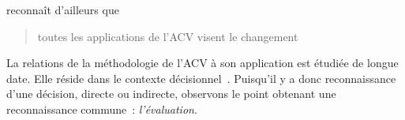 \citeauthor{tillman_significance_2000} reconnaît d'ailleurs que 
\blockcquote{tillman_significance_2000}{toutes les applications de l'\gls{ACV} visent le changement}.
La relations de la méthodologie de l'\gls{ACV} à son application est étudiée de longue date.
Elle réside dans le contexte décisionnel~\cite{wenzel_application_1998}.
Puisqu'il y a donc reconnaissance d'une décision, directe ou indirecte, observons le point obtenant une reconnaissance commune~: \emph{l'évaluation}.

